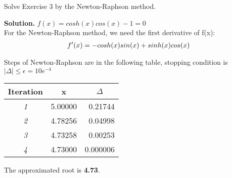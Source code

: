 \begin{exercise}{4} %
Solve Exercise 3 by the Newton-Raphson method.

\textbf{Solution.} 
$f(x) = cosh(x)cos(x)-1=0$ \\

For the Newton-Raphson method, we need the first derivative of f(x):
\begin{align}
f^\prime(x) = -cosh(x)sin(x) + sinh(x)cos(x) \notag
\end{align}

Steps of Newton-Raphson are in the following table, stopping condition is $|\Delta| \leq \epsilon = 10e^{-4}$ 

\begin{table}[H]
\centering
\begin{tabular}{|c|r|r|}
\hline
\textbf{Iteration} & \multicolumn{1}{c|}{\textbf{x}} & \multicolumn{1}{c|}{\textbf{\(\Delta\)}} \\ \hline
\textit{1} & 5.00000 & 0.21744 \\ \hline
\textit{2} & 4.78256 & 0.04998 \\ \hline
\textit{3} & 4.73258 & 0.00253 \\ \hline
\textit{4} & 4.73000 & 0.000006 \\ \hline
\end{tabular}
\end{table}

The approximated root is  \textbf{4.73}.
\end{exercise}

